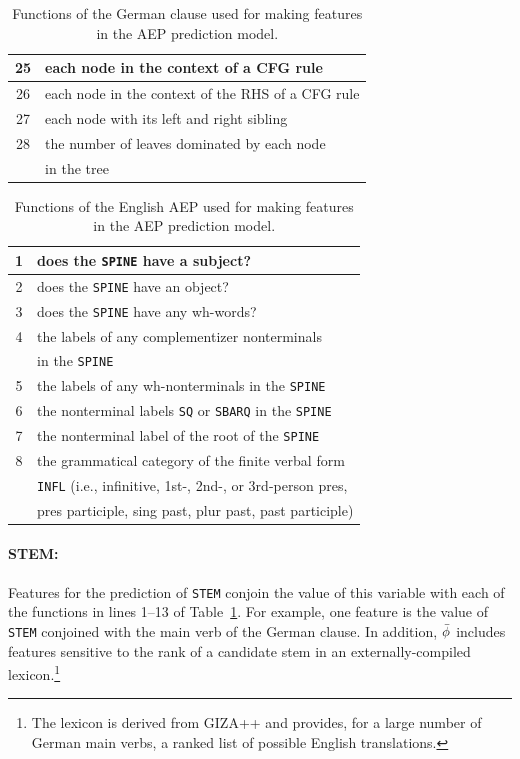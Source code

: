 \documentclass[10pt]{report}
\theoremstyle{plain}
\begin{document}
{\begin{table}[!h]
\begin{center}
\begin{small}
\begin{tabular}{|c|l|}
\hline
25 & each node in the context of a CFG rule \\
\hline
26 & each node in the context of the RHS of a CFG rule \\
\hline
27 & each node with its left and right sibling \\
\hline
28 & the number of leaves dominated by each node \\
&in the tree \\
\hline
\end{tabular}
\end{small}
\end{center}
\caption{Functions of the German clause used for making features in
the AEP prediction model.}
\label{GERfunc}
\end{table}

\begin{table}[!h]
\begin{center}
\begin{small}
\begin{tabular}{|c|l|}
\hline
1 & does the {\tt SPINE} have a subject? \\
\hline
2 & does the {\tt SPINE} have an object? \\
\hline
3 & does the {\tt SPINE} have any wh-words? \\
\hline
4 & the labels of any complementizer nonterminals \\
& in the {\tt SPINE} \\
\hline
5 & the labels of any wh-nonterminals in the {\tt SPINE} \\
\hline
6 & the nonterminal labels {\tt SQ} or {\tt SBARQ} in the {\tt SPINE} \\
\hline
7 & the nonterminal label of the root of the {\tt SPINE} \\
\hline
8 & the grammatical category of the finite verbal form\\
 &  {\tt INFL} (i.e., infinitive, 1st-, 2nd-, or 3rd-person pres,\\
& pres participle, sing past, plur past, past participle) \\
\hline
\end{tabular}
\end{small}
\end{center}
\caption{Functions of the English AEP used for making features
in the AEP prediction model.}
\label{AEPfunc}
\end{table}

\paragraph{STEM:} 
Features for the prediction of {\tt STEM} conjoin
the value of this variable with each of the functions in lines 1--13
of Table~\ref{GERfunc}.  For example, one feature is the value of {\tt
STEM} conjoined with the main verb of the German clause. In addition,
$\bar{\phi}$ includes features sensitive to the rank of a
candidate stem in an externally-compiled lexicon.\footnote{The lexicon
is derived from GIZA++ and provides, for a large number of German main
verbs, a ranked list of possible English translations.}

}
\end{document}
